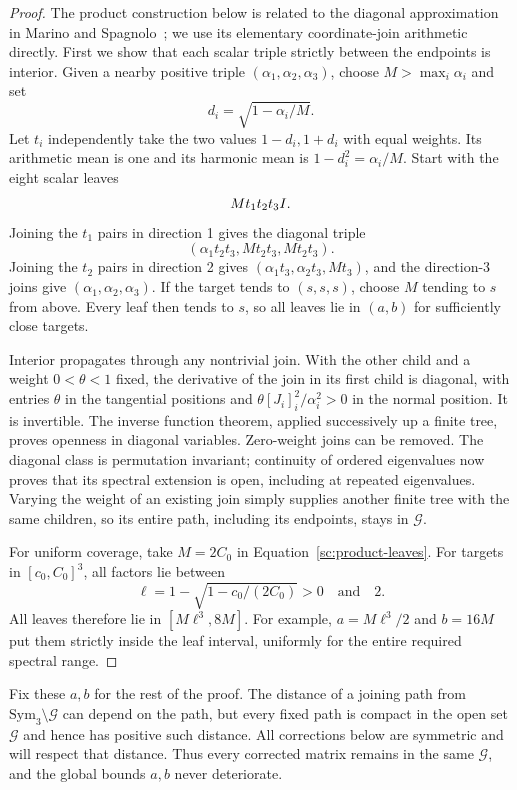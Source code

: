 \begin{proof}
The product construction below is related to the diagonal
approximation in Marino and Spagnolo~\cite[Section~3]{MarinoSpagnolo};
we use its elementary coordinate-join arithmetic directly.
First we show that each scalar triple strictly between the endpoints
is interior. Given a nearby positive triple $(\alpha_1,\alpha_2,
\alpha_3)$, choose $M>\max_i\alpha_i$ and set
\[
 d_i=\sqrt{1-\alpha_i/M}.
\]
Let $t_i$ independently take the two values $1-d_i,1+d_i$ with
equal weights. Its arithmetic mean is one and its harmonic mean is
$1-d_i^2=\alpha_i/M$. Start with the eight scalar leaves
\begin{equation}
 \label{sc:product-leaves}
 M t_1t_2t_3I.
\end{equation}
Joining the $t_1$ pairs in direction 1 gives the diagonal triple
\[
 (\alpha_1t_2t_3,Mt_2t_3,Mt_2t_3).
\]
Joining the $t_2$ pairs in direction 2 gives
$(\alpha_1t_3,\alpha_2t_3,Mt_3)$, and the direction-3 joins give
$(\alpha_1,\alpha_2,\alpha_3)$. If the target tends to $(s,s,s)$,
choose $M$ tending to $s$ from above. Every leaf then tends to $s$,
so all leaves lie in $(a,b)$ for sufficiently close targets.

Interior propagates through any nontrivial join. With the other
child and a weight $0<\theta<1$ fixed, the derivative of the join
in its first child is diagonal, with entries $\theta$ in the
tangential positions and $\theta[J_i]_i^2/\alpha_i^2>0$ in the
normal position. It is invertible. The inverse function theorem,
applied successively up a finite tree, proves openness in diagonal
variables. Zero-weight joins can be removed. The diagonal class is
permutation invariant; continuity of ordered eigenvalues now proves
that its spectral extension is open, including at repeated
eigenvalues. Varying the weight of an existing join simply supplies
another finite tree with the same children, so its entire path,
including its endpoints, stays in $\mathcal G$.

For uniform coverage, take $M=2C_0$ in
Equation~\eqref{sc:product-leaves}. For targets in $[c_0,C_0]^3$,
all factors lie between
\[
 \ell=1-\sqrt{1-c_0/(2C_0)}>0
 \quad\text{and}\quad 2.
\]
All leaves therefore lie in $[M\ell^3,8M]$. For example,
$a=M\ell^3/2$ and $b=16M$ put them strictly inside the leaf
interval, uniformly for the entire required spectral range.
\end{proof}

Fix these $a,b$ for the rest of the proof. The distance of a joining
path from $\mathrm{Sym}_3\setminus\mathcal G$ can depend on the path,
but every fixed path is compact in the open set $\mathcal G$ and hence
has positive such distance. All corrections below are symmetric and
will respect that distance. Thus every corrected matrix remains in
the same $\mathcal G$, and the global bounds $a,b$ never deteriorate.

